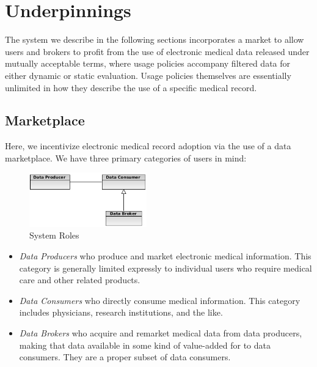 \documentclass[10pt, conference, compsocconf]{IEEEtran}
\begin{document}
\section{Underpinnings}
The system we describe in the following sections incorporates a market to allow users and brokers to profit from the use of electronic medical data released under mutually acceptable terms, where usage policies accompany filtered data for either dynamic or static evaluation.  Usage policies themselves are essentially unlimited in how they describe the use of a specific medical record.

\subsection{Marketplace} 
Here, we incentivize electronic medical record adoption via the use of a data marketplace.  We have three primary categories of users in mind:

\begin{figure}[!t]
\centering
\includegraphics[width=2in]{roles}
\caption{System Roles}
\label{System Roles}
\end{figure}

\begin{itemize}
\item \textit{Data Producers} who produce and market electronic medical information.  This category is generally limited expressly to individual users who require medical care and other related products.
\item \textit{Data Consumers} who directly consume medical information.  This category includes physicians, research institutions, and the like.
\item \textit{Data Brokers} who acquire and remarket medical data from data producers, making that data available in some kind of value-added for to data consumers.  They are a proper subset of data consumers.
\end{itemize}
\end{document}
